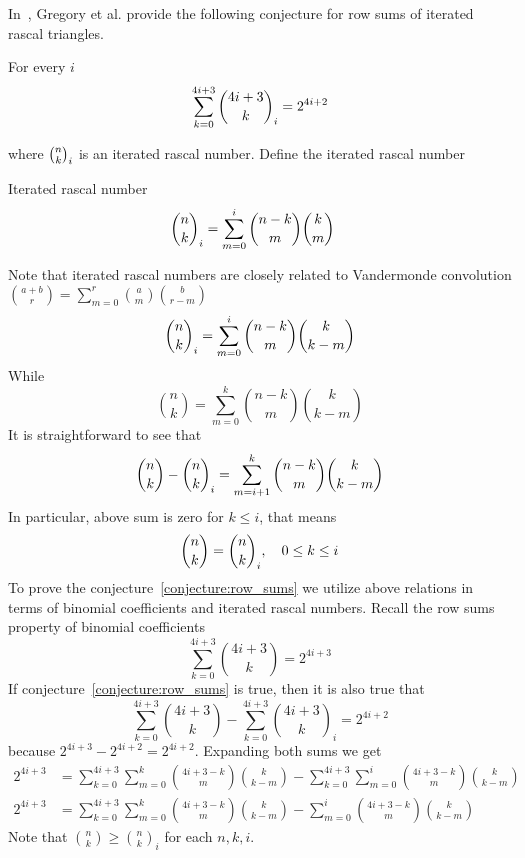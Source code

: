 In~\cite{gregory2023iterated}, Gregory et al.
provide the following conjecture for row sums of iterated rascal triangles.
\begin{conjecture}
    \label{conjecture:row_sums}
    For every $i$
    \begin{align*}
        \sum_{k=0}^{4i+3} \binom{4i+3}{k}_{i} = 2^{4i+2}
    \end{align*}
\end{conjecture}
where $\binom{n}{k}_{i}$ is an iterated rascal number.
Define the iterated rascal number
\begin{definition}
    Iterated rascal number
    \begin{align*}
        \binom{n}{k}_{i} &= \sum_{m=0}^{i} \binom{n-k}{m} \binom{k}{m}
    \end{align*}
\end{definition}
Note that iterated rascal numbers are closely related to Vandermonde convolution
$\binom{a+b}{r} = \sum_{m=0}^{r} \binom{a}{m} \binom{b}{r-m}$
\begin{equation*}
    \binom{n}{k}_{i} = \sum_{m=0}^{i} \binom{n-k}{m} \binom{k}{k-m}
\end{equation*}
While
\begin{equation*}
    \binom{n}{k}= \sum_{m=0}^{k} \binom{n-k}{m} \binom{k}{k-m}
\end{equation*}
It is straightforward to see that
\begin{equation*}
    \binom{n}{k} - \binom{n}{k}_{i} = \sum_{m=i+1}^{k} \binom{n-k}{m} \binom{k}{k-m}
\end{equation*}
In particular, above sum is zero for $k \leq i$, that means
\begin{equation*}
    \binom{n}{k} = \binom{n}{k}_{i}, \quad  0 \leq k \leq i
\end{equation*}
To prove the conjecture~\eqref{conjecture:row_sums}
we utilize above relations in terms of binomial coefficients and iterated rascal numbers.
Recall the row sums property of binomial coefficients
\begin{equation*}
    \sum_{k=0}^{4i+3} \binom{4i+3}{k} = 2^{4i+3}
\end{equation*}
If conjecture~\eqref{conjecture:row_sums} is true, then it is also true that
\begin{equation*}
     \sum_{k=0}^{4i+3} \binom{4i+3}{k} -  \sum_{k=0}^{4i+3} \binom{4i+3}{k}_i = 2^{4i+2}
\end{equation*}
because $2^{4i+3} - 2^{4i+2} = 2^{4i+2}$.
Expanding both sums we get
\begin{align*}
    2^{4i+3} &= \sum_{k=0}^{4i+3} \sum_{m=0}^{k} \binom{4i+3-k}{m} \binom{k}{k-m} - \sum_{k=0}^{4i+3} \sum_{m=0}^{i} \binom{4i+3-k}{m} \binom{k}{k-m}\\
    2^{4i+3} &= \sum_{k=0}^{4i+3} \sum_{m=0}^{k} \binom{4i+3-k}{m} \binom{k}{k-m} - \sum_{m=0}^{i} \binom{4i+3-k}{m} \binom{k}{k-m}
\end{align*}
Note that $\binom{n}{k} \geq \binom{n}{k}_i$ for each $n,k,i$.
